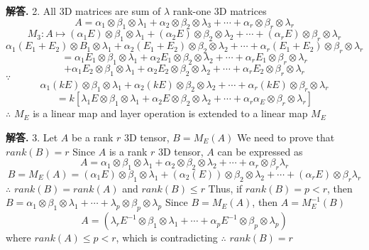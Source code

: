 \documentclass[12pt, a4paper, oneside]{article}
\newenvironment{solution}{\par\noindent\textbf{解答. }}{\par}
\begin{document}
\begin{CJK}{UTF8}{gbsn}
\begin{solution}
  2. \newline
  All 3D matrices are sum of $\lambda$ rank-one 3D matrices \newline
  $$A = \alpha_1 \otimes \beta_1 \otimes \lambda_1 + \alpha_2 \otimes  \beta_2 \otimes \lambda_3 + \cdots + \alpha_r \otimes \beta_r \otimes \lambda_r $$
  $$ M_3 : A \mapsto (\alpha_1E) \otimes \beta_1 \otimes \lambda_1 + (\alpha_2 E)\otimes \beta_2 \otimes \lambda_2 + \cdots + (\alpha_r E)\otimes \beta_r \otimes \lambda_r $$ 
  $$ \alpha_1(E_1 + E_2)\otimes B_1 \otimes \lambda_1 + \alpha_2(E_1+E_2)\otimes \beta_2 \otimes \lambda_2 + \cdots + \alpha_r(E_1 +E_2)\otimes\beta_r\otimes\lambda_r $$ 
  $$ = \alpha_1E_1\otimes\beta_1\otimes\lambda_1+\alpha_2E_1\otimes\beta_2\otimes\lambda_2+\cdots+\alpha_rE_1\otimes\beta_r\otimes\lambda_r$$
  $$ + \alpha_1E_2\otimes\beta_1\otimes\lambda_1+\alpha_2E_2\otimes\beta_2\otimes\lambda_2+\cdots+\alpha_rE_2\otimes\beta_r\otimes\lambda_r$$
  $\because$
  $$\alpha_1(kE)\otimes\beta_1\otimes\lambda_1+\alpha_2(kE)\otimes\beta_2\otimes\lambda_2+\cdots+\alpha_r(kE)\otimes\beta_r\otimes\lambda_r$$
  $$=k\left[\lambda_1E\otimes\beta_1\otimes\lambda_1+\alpha_2E\otimes\beta_2\otimes\lambda_2+\cdots+\alpha_r\alpha_E\otimes\beta_r\otimes\lambda_r\right]$$
  $\therefore$ $M_E$ is a linear map and layer operation is extended to a linear map $M_E$
\end{solution}

\begin{solution}
  3. \newline
  Let $A$ be a rank $r$ 3D tensor, $B=M_E(A)$ \newline
  We need to prove that $rank(B) = r$
  Since $A$ is a rank $r$ 3D tensor, $A$ can be expressed as 
  $$A = \alpha_1\otimes\beta_1\otimes\lambda_1 + \alpha_2\otimes\beta_2\otimes\lambda_2+\cdots+\alpha_r\otimes\beta_r\lambda_r$$
  $$B = M_E(A) = (\alpha_1E)\otimes\beta_1\otimes\lambda_1 + (\alpha_2(E))\otimes\beta_2\otimes\lambda_2+\cdots+(\alpha_rE)\otimes\beta_r\lambda_r$$
  $\therefore$ $rank(B)=rank(A)$ and $rank(B)\leq r$ \newline
  Thus, if $rank(B) = p < r$, then $B=\alpha_1\otimes\beta_1\otimes\lambda_1+\cdots+\lambda_p\otimes\beta_p\otimes\lambda_p$ \newline
  Since $B=M_E(A)$, then $A = M_E^{-1}(B)$
  $$A=(\lambda_rE^{-1}\otimes\beta_1\otimes\lambda_1+\cdots+\alpha_pE^{-1}\otimes\beta_p\otimes\lambda_p)$$
  where $rank(A) \leq p < r$, which is contradicting \newline
  $\therefore$ $rank(B) = r$
\end{solution}


\end{CJK}
\end{document}
